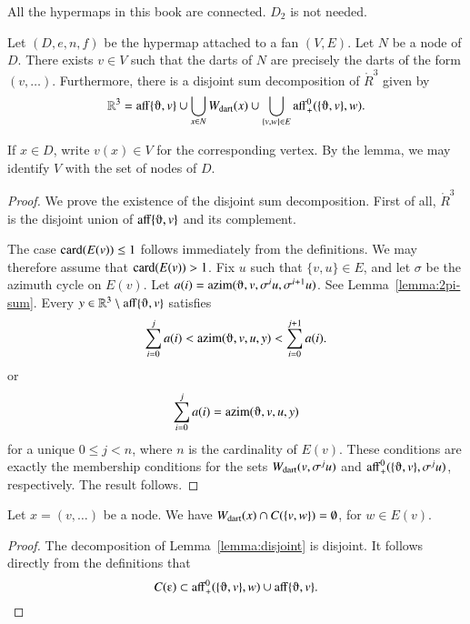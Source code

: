 \begin{note}%
All the hypermaps in this book are connected. $D_2$ is not needed.
\end{note}


\begin{lemma}
Let $(D,e,n,f)$ be the hypermap attached to a 
fan $(V,E)$.
Let $N$ be a node of $D$.  There exists $v\in V$
such that the darts of $N$ are precisely
the darts of the form $(v,\ldots)$.  Furthermore, there is a 
disjoint sum decomposition of $\ring{R}^3$ given by
  $$
  \ring{R}^3 = 
  \op{aff}\{\orgn,v\} \cup
  \bigcup_{x\in N} \Wdart(x)  \cup 
  \bigcup_{\{v,w\}\in E} \op{aff}_+^0(\{\orgn,v\},w).
  $$
\end{lemma}

If $x\in D$, write $v(x)\in V$ for the corresponding vertex.  By the lemma,
we may identify $V$ with the set of nodes of $D$.

\begin{proof}
We prove the existence of the disjoint sum decomposition.
First of all, $\ring{R}^3$ is the disjoint union of $\op{aff}\{\orgn,v\}$
and its complement.

The case ${\operatorname{card}}(E(v))\le 1$ follows immediately from the definitions.  
We may therefore assume  that ${\operatorname{card}}(E(v)) >1$.
Fix $u$ such that $\{v,u\}\in E$, and let $\sigma$ be the azimuth
cycle on $E(v)$.  Let $a(i)=\op{azim}(\orgn,v,\sigma^i u,\sigma^{i+1}u)$.   See Lemma~\ref{lemma:2pi-sum}.  Every $y\in\ring{R}^3\setminus\op{aff}\{\orgn,v\}$ satisfies
$$
\sum_{i=0}^j a(i) <
\op{azim}(\orgn,v,u,y) < \sum_{i=0}^{j+1} a(i).
$$
or 
$$
\sum_{i=0}^j a(i) = \op{azim}(\orgn,v,u,y)
$$
for a unique $0 \le j < n$, where $n$ is the cardinality of $E(v)$. 
These conditions are exactly the membership conditions for the sets
$
W_{\text{dart}}(v,\sigma^j u)
$
and $\op{aff}_+^0(\{\orgn,v\},\sigma^j u)$, respectively.
The result follows.
\end{proof}

\begin{corollary}
Let $x = (v,\ldots)$ be a node.
We have $W_{\text{dart}}(x)\cap C(\{v,w\})=\emptyset$, for $w\in E(v)$.
\end{corollary}

\begin{proof} The decomposition of Lemma~\ref{lemma:disjoint} is
disjoint.  It follows directly from the definitions that
   $$C(\e)\subset \op{aff}_+^0(\{\orgn,v\},w) \cup 
    \op{aff}\{\orgn,v\}.$$
\end{proof}

